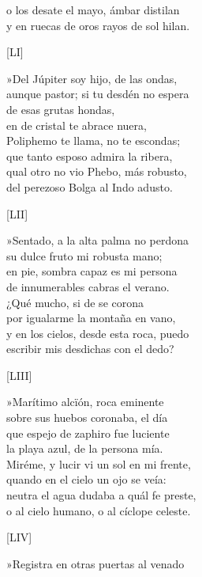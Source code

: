 \documentclass[11pt,a4paper,twoside]{article}
\begin{document}
o los desate el mayo, ámbar distilan\\
y en ruecas de oros rayos de sol hilan.\pend
\begin{center}
	[LI]
\end{center}\pstart
»Del Júpiter soy hijo, de las ondas,\\
aunque pastor; si tu desdén no espera\\
 de esas grutas hondas,\\
en  de cristal te abrace nuera,\\
Poliphemo te llama, no te escondas;\\
que tanto esposo admira la ribera,\\
qual otro no vio Phebo, más robusto,\\
del perezoso Bolga al Indo adusto.\pend 
\begin{center}
	[LII]
\end{center}\pstart
»Sentado, a la alta palma no perdona\\
su dulce fruto mi robusta mano;\\
en pie, sombra capaz es mi persona\\
de innumerables cabras el verano.\\
¿Qué mucho, si de  se corona\\
por igualarme la montaña en vano,\\
y en los cielos, desde esta roca, puedo\\
escribir mis desdichas con el dedo?\pend
\begin{center}
	[LIII]
\end{center}\pstart
»Marítimo alcïón, roca eminente\\
sobre sus huebos coronaba, el día\\
que espejo de zaphiro fue luciente\\
la playa azul, de la persona mía.\\
Miréme, y lucir vi un sol en mi frente,\\
quando en el cielo un ojo se veía:\\
neutra el agua dudaba a quál fe preste,\\
o al cielo humano, o al cíclope celeste.\pend
\begin{center}
	[LIV]
\end{center}\pstart
»Registra en otras puertas al venado\\
\end{document}
